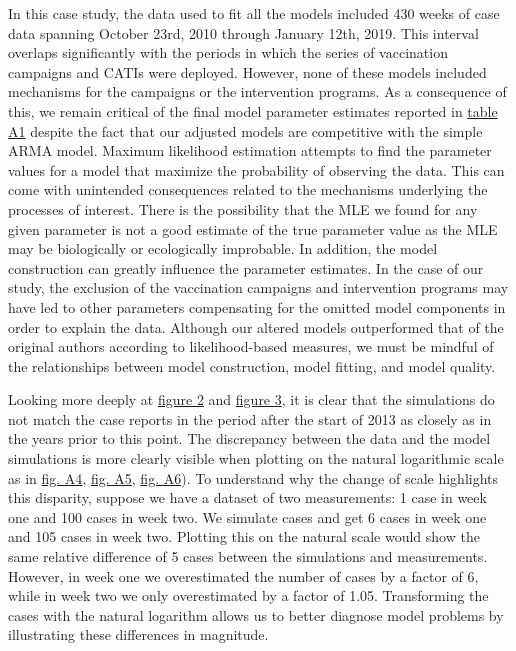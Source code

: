 \documentclass[12pt]{article}
\begin{document}
   In this case study, the data used to fit all the models included 430 weeks of case data spanning October 23rd, 2010 through January 12th, 2019. This interval overlaps significantly with the periods in which the series of vaccination campaigns and CATIs were deployed. However, none of these models included mechanisms for the campaigns or the intervention programs. As a consequence of this, we remain critical of the final model parameter estimates reported in \hyperref[tab:A1]{table A1} despite the fact that our adjusted models are competitive with the simple ARMA model. Maximum likelihood estimation attempts to find the parameter values for a model that maximize the probability of observing the data. This can come with unintended consequences related to the mechanisms underlying the processes of interest. There is the possibility that the MLE we found for any given parameter is not a good estimate of the true parameter value as the MLE may be biologically or ecologically improbable. In addition, the model construction can greatly influence the parameter estimates. In the case of our study, the exclusion of the vaccination campaigns and intervention programs may have led to other parameters compensating for the omitted model components in order to explain the data. Although our altered models outperformed that of the original authors according to likelihood\hyp{}based measures, we must be mindful of the relationships between model construction, model fitting, and model quality.
   
   Looking more deeply at \hyperref[fig:2]{figure 2} and \hyperref[fig:3]{figure 3}, it is clear that the simulations do not match the case reports in the period after the start of 2013 as closely as in the years prior to this point. The discrepancy between the data and the model simulations is more clearly visible when plotting on the natural logarithmic scale as in \hyperref[fig:A4]{fig. A4}, \hyperref[fig:A5]{fig. A5}, \hyperref[fig:A6]{fig. A6}). To understand why the change of scale highlights this disparity, suppose we have a dataset of two measurements: 1 case in week one and 100 cases in week two. We simulate cases and get 6 cases in week one and 105 cases in week two. Plotting this on the natural scale would show the same relative difference of 5 cases between the simulations and measurements. However, in week one we overestimated the number of cases by a factor of 6, while in week two we only overestimated by a factor of 1.05. Transforming the cases with the natural logarithm allows us to better diagnose model problems by illustrating these differences in magnitude. 
   
\end{document}
